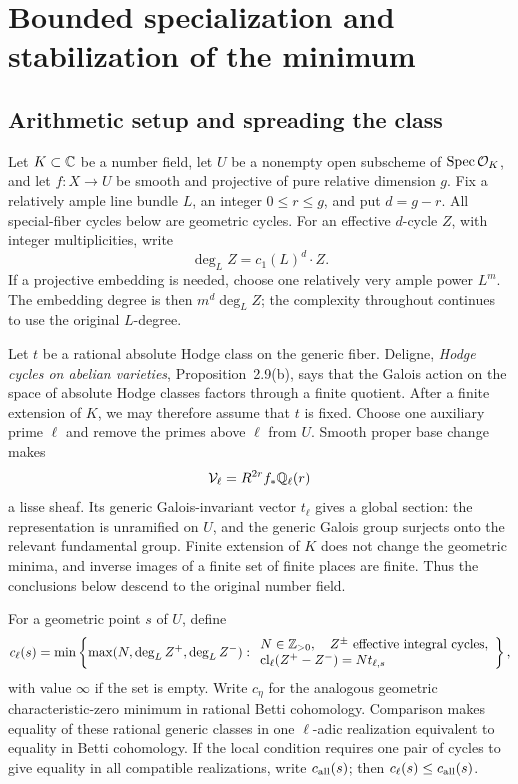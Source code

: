 \section{Bounded specialization and stabilization of the minimum}
\label{sec:bounded}

\subsection{Arithmetic setup and spreading the class}
Let $K\subset\mathbb C$ be a number field, let $U$ be a nonempty open subscheme of
$\operatorname{Spec}\mathcal O_K$, and let $f:X\to U$ be smooth and projective of pure relative
dimension $g$. Fix a relatively ample line bundle $L$, an integer $0\leq r\leq g$,
and put $d=g-r$. All special-fiber cycles below are geometric cycles. For an
effective $d$-cycle $Z$, with integer multiplicities, write
\[
 \deg_L Z=c_1(L)^d\cdot Z.
\]
If a projective embedding is needed, choose one relatively very ample power
$L^m$. The embedding degree is then $m^d\deg_L Z$; the complexity throughout
continues to use the original $L$-degree.

Let $t$ be a rational absolute Hodge class on the generic fiber. Deligne,
\emph{Hodge cycles on abelian varieties}, Proposition~2.9(b), says that the
Galois action on the space of absolute Hodge classes factors through a finite
quotient. After a finite extension of $K$, we may therefore assume that $t$ is
fixed. Choose one auxiliary prime $\ell$ and remove the primes above $\ell$
from $U$. Smooth proper base change makes
\[
 \mathcal V_\ell=R^{2r}f_*\mathbb Q_\ell(r)
\]
a lisse sheaf. Its generic Galois-invariant vector $t_\ell$ gives a global
section: the representation is unramified on $U$, and the generic Galois group
surjects onto the relevant fundamental group. Finite extension of $K$ does not
change the geometric minima, and inverse images of a finite set of finite
places are finite. Thus the conclusions below descend to the original
number field.

For a geometric point $s$ of $U$, define
\[
 c_\ell(s)=\min\left\{\max(N,\deg_L Z^+,\deg_L Z^-):
 \begin{array}{l}N\in\mathbb Z_{>0},\quad Z^\pm\text{ effective integral cycles},\\
 \operatorname{cl}_\ell(Z^+-Z^-)=Nt_{\ell,s}\end{array}\right\},
\]
with value $\infty$ if the set is empty. Write $c_\eta$ for the analogous
geometric characteristic-zero minimum in rational Betti cohomology.
Comparison makes equality of these rational generic classes in one
$\ell$-adic realization equivalent to equality in Betti cohomology. If the
local condition requires one pair of cycles to give equality in all
compatible realizations, write $c_{\rm all}(s)$; then
$c_\ell(s)\leq c_{\rm all}(s)$.

